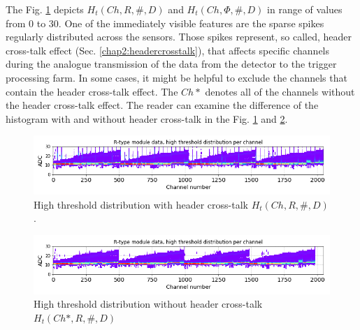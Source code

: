 The Fig. \ref{plot:P2-threshold-all-zoom} depicts $H_t(Ch, R, \#, D)$ and $H_t(Ch, \Phi, \#, D)$ in range of values from 0 to 30.
One of the immediately visible features are the sparse spikes regularly distributed across the sensors.
Those spikes represent, so called, header cross-talk effect (Sec. \ref{chap2:headercrosstalk}), that affects specific channels during the analogue transmission of the data from the detector to the trigger processing farm.
In some cases, it might be helpful to exclude the channels that contain the header cross-talk effect.
The $Ch*$ denotes all of the channels without the header cross-talk effect.
The reader can examine the difference of the histogram with and without header cross-talk in the Fig. \ref{plot:P2-threshold-all-zoom} and \ref{plot:P2-threshold-all-zoom-nohc}.


\begin{figure}
    \centering
    \includegraphics[width=0.9\linewidth]{figures/chapter4/calib_analysis/P2-threshold-all-zoom.png}
    \caption{High threshold distribution with header cross-talk $H_t(Ch, R, \#, D)$.}
    \label{plot:P2-threshold-all-zoom}
\end{figure}

\begin{figure}
    \centering
    \includegraphics[width=0.9\linewidth]{figures/chapter4/calib_analysis/P2-threshold-all-zoom-nohc.png}
    \caption{High threshold distribution without header cross-talk $H_t(Ch*, R, \#, D)$}
    \label{plot:P2-threshold-all-zoom-nohc}
\end{figure}


